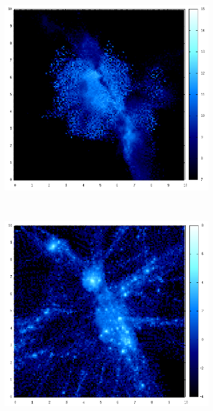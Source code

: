 \documentclass[journal]{IEEEtran}
\begin{document}
\begin{figure}[h!]
\begin{subfigure}[t]{0.25\textwidth}
	\end{subfigure}
	\quad
	\begin{subfigure}[t]{0.25\textwidth}
		\centering
		\includegraphics[width=\linewidth]{TEMP02-03.png}
	\end{subfigure}
	\\
	\begin{subfigure}[t]{0.25\textwidth}
		\centering
		\includegraphics[width=\linewidth]{DM03-04.png}

\end{subfigure}
\end{figure}
\end{document}
